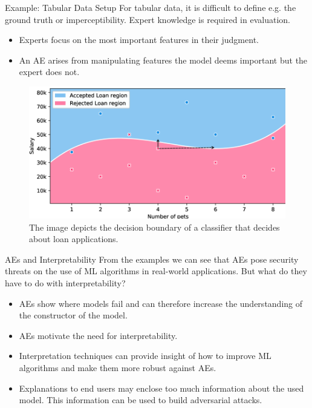 \documentclass[11pt,compress,t,notes=noshow, xcolor=table]{beamer}
\begin{document}
\begin{vbframe}{Example: Tabular Data Setup}
For tabular data, it is difficult to define e.g. the ground truth or imperceptibility. Expert knowledge is required in evaluation.
\begin{itemize}
    \item Experts focus on the most important features in their judgment.
    \item An AE arises from manipulating features the model deems important but the expert does not.
\end{itemize}
\begin{figure}[h]
\centering
\includegraphics[width=0.6\linewidth]{figure/AEloanApplication.png}
  \caption{The image depicts the decision boundary of a classifier that decides about loan applications.}
  \label{fig:mnist}
\end{figure} 
\end{vbframe}

\begin{vbframe}{AEs and Interpretability}
From the examples we can see that AEs pose security threats on the use of ML algorithms in real-world applications. But what do they have to do with interpretability?

\begin{itemize}
    \item AEs show where models fail and can therefore increase the understanding of the constructor of the model.
    \item AEs motivate the need for interpretability.
    \item Interpretation techniques can provide insight of how to improve ML algorithms and make them more robust against AEs.
    \item Explanations to end users may enclose too much information about the used model. This information can be used to build adversarial attacks.
\end{itemize}
\end{vbframe}
\end{document}

